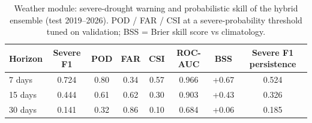 \begin{table}[H]
\centering
\caption{Weather module: severe-drought warning and probabilistic skill of the hybrid ensemble (test 2019--2026). POD / FAR / CSI at a severe-probability threshold tuned on validation; BSS = Brier skill score vs climatology.}
\label{tab:w_severe}
\footnotesize
\begin{tabular}{@{}lccccccc@{}}
\toprule
\textbf{Horizon} & \textbf{Severe F1} & \textbf{POD} & \textbf{FAR} & \textbf{CSI} & \textbf{ROC-AUC} & \textbf{BSS} & \textbf{Severe F1 persistence} \\
\midrule
7 days & 0.724 & 0.80 & 0.34 & 0.57 & 0.966 & +0.67 & 0.524 \\
15 days & 0.444 & 0.61 & 0.62 & 0.30 & 0.903 & +0.43 & 0.326 \\
30 days & 0.141 & 0.32 & 0.86 & 0.10 & 0.684 & +0.06 & 0.185 \\
\bottomrule
\end{tabular}
\end{table}

